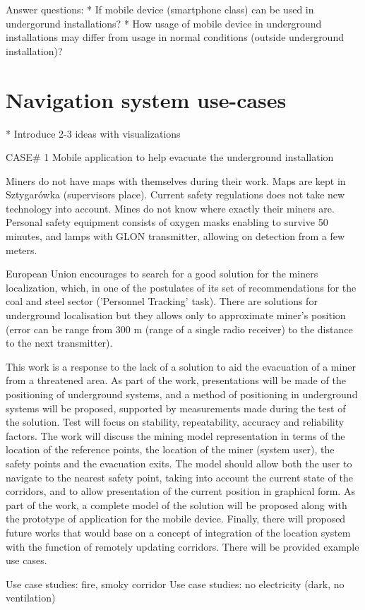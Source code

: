 \documentclass[../main.tex]{subfiles}
\begin{document}
Answer questions:
* If mobile device (smartphone class) can be used in undergorund installations?
* How usage of mobile device in underground installations may differ from usage in normal conditions (outside underground installation)?

\section{Navigation system use-cases}
* Introduce 2-3 ideas with visualizations

CASE# 1 Mobile application to help evacuate the underground installation

Miners do not have maps with themselves during their work. Maps are kept in Sztygarówka (supervisors place).
Current safety regulations does not take new technology into account. Mines do not know where exactly their miners are. Personal safety equipment consists of oxygen masks enabling to survive 50 minutes, and lamps with GLON transmitter, allowing on detection from a few meters.

European Union encourages to search for a good solution for the miners localization, which, in one of the postulates of its set of recommendations for the coal and steel sector ('Personnel Tracking' task). There are solutions for underground localisation but they allows only to approximate miner's position (error can be range from 300 m (range of a single radio receiver) to the distance to the next transmitter).

This work is a response to the lack of a solution to aid the evacuation of a miner from a threatened area. As part of the work, presentations will be made of the positioning of underground systems, and a method of positioning in underground systems will be proposed, supported by measurements made during the test of the solution. Test will focus on stability, repeatability, accuracy and reliability factors. The work will discuss the mining model representation in terms of the location of the reference points, the location of the miner (system user), the safety points and the evacuation exits. The model should allow both the user to navigate to the nearest safety point, taking into account the current state of the corridors, and to allow presentation of the current position in graphical form. As part of the work, a complete model of the solution will be proposed along with the prototype of application for the mobile device. Finally, there will proposed future works that would base on a concept of integration of the location system with the function of remotely updating corridors. There will be provided example use cases.

  Use case studies: fire, smoky corridor
  Use case studies: no electricity (dark, no ventilation)
\end{document}
